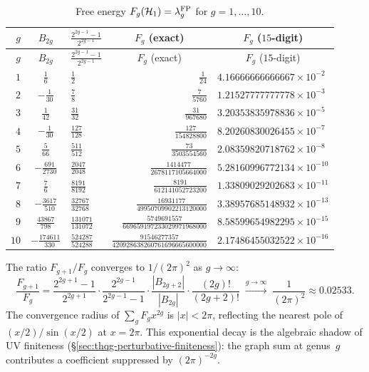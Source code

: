 \begin{center}
\renewcommand{\arraystretch}{1.4}
\begin{longtable}{rclrl}
\caption{Free energy $F_g(\mathcal{H}_1) =
\lambda_g^{\mathrm{FP}}$ for $g = 1, \ldots, 10$.}
\label{tab:thqg-VII-extended-table}\\
$g$ & $B_{2g}$ & $\frac{2^{2g-1}-1}{2^{2g-1}}$
& \multicolumn{1}{c}{$F_g$ (exact)}
& \multicolumn{1}{c}{$F_g$ ($15$-digit)} \\
\hline
\endfirsthead
$g$ & $B_{2g}$ & $\frac{2^{2g-1}-1}{2^{2g-1}}$
& \multicolumn{1}{c}{$F_g$ (exact)}
& \multicolumn{1}{c}{$F_g$ ($15$-digit)} \\
\hline
\endhead
$1$
 & $\frac{1}{6}$
 & $\frac{1}{2}$
 & $\frac{1}{24}$
 & $4.16666666666667 \times 10^{-2}$ \\[4pt]
$2$
 & $-\frac{1}{30}$
 & $\frac{7}{8}$
 & $\frac{7}{5760}$
 & $1.21527777777778 \times 10^{-3}$ \\[4pt]
$3$
 & $\frac{1}{42}$
 & $\frac{31}{32}$
 & $\frac{31}{967680}$
 & $3.20353835978836 \times 10^{-5}$ \\[4pt]
$4$
 & $-\frac{1}{30}$
 & $\frac{127}{128}$
 & $\frac{127}{154828800}$
 & $8.20260830026455 \times 10^{-7}$ \\[4pt]
$5$
 & $\frac{5}{66}$
 & $\frac{511}{512}$
 & $\frac{73}{3503554560}$
 & $2.08359820718762 \times 10^{-8}$ \\[4pt]
$6$
 & $-\frac{691}{2730}$
 & $\frac{2047}{2048}$
 & $\frac{1414477}{2678117105664000}$
 & $5.28160996772134 \times 10^{-10}$ \\[4pt]
$7$
 & $\frac{7}{6}$
 & $\frac{8191}{8192}$
 & $\frac{8191}{612141052723200}$
 & $1.33809029202683 \times 10^{-11}$ \\[4pt]
$8$
 & $-\frac{3617}{510}$
 & $\frac{32767}{32768}$
 & $\frac{16931177}{49950709902213120000}$
 & $3.38957685148932 \times 10^{-13}$ \\[4pt]
$9$
 & $\frac{43867}{798}$
 & $\frac{131071}{131072}$
 & $\frac{5749691557}{669659197233029971968000}$
 & $8.58599654982295 \times 10^{-15}$ \\[4pt]
$10$
 & $-\frac{174611}{330}$
 & $\frac{524287}{524288}$
 & $\frac{91546277357}{420928638260761696665600000}$
 & $2.17486455032522 \times 10^{-16}$
\end{longtable}
\end{center}

\begin{remark}
\label{rem:thqg-VII-asymptotics}
The ratio $F_{g+1}/F_g$ converges to $1/(2\pi)^2$ as
$g \to \infty$:
\[
\frac{F_{g+1}}{F_g}
= \frac{2^{2g+1}-1}{2^{2g+1}} \cdot
\frac{2^{2g-1}}{2^{2g-1}-1} \cdot
\frac{|B_{2g+2}|}{|B_{2g}|} \cdot
\frac{(2g)!}{(2g+2)!}
\;\xrightarrow{g \to \infty}\;
\frac{1}{(2\pi)^2}
\approx 0.02533.
\]
The convergence radius of $\sum_g F_g x^{2g}$ is
$|x| < 2\pi$, reflecting the nearest pole of
$(x/2)/\sin(x/2)$ at $x = 2\pi$. This exponential
decay is the algebraic shadow of UV finiteness
(\S\ref{sec:thqg-perturbative-finiteness}): the graph
sum at genus~$g$ contributes a coefficient suppressed
by $(2\pi)^{-2g}$.
\end{remark}

